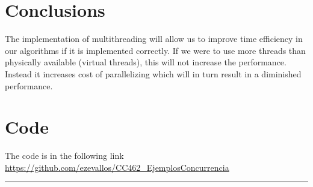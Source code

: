 \documentclass[10pt,a4paper]{article}
\theoremstyle{definition}
\begin{document}
\section{Conclusions}
The implementation of multithreading will allow us to improve time efficiency in our algorithms if it is implemented correctly. If we were to use more threads than physically available (virtual threads), this will not increase
the performance. Instead it increases cost of parallelizing which will in turn result in a diminished performance.
\section{Code}
The code is in the following link \url{https://github.com/ezevallos/CC462_EjemplosConcurrencia}



\vspace{20pt}
\hrule
\vspace{10pt}

\nocite{*}
%



\end{document}
